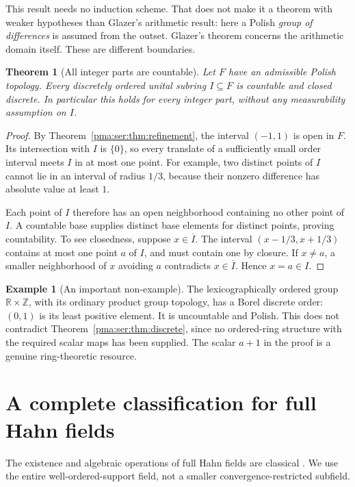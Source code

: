 \documentclass[11pt]{article}
\numberwithin{equation}{section}
\newtheorem{theorem}{Theorem}[section]
\theoremstyle{definition}
\newtheorem{example}[example]{Example}
\theoremstyle{remark}
\newcommand{\Z}{\mathbb Z}
\newcommand{\R}{\mathbb R}
\begin{document}
This result needs no induction scheme. That does not make it a theorem with
weaker hypotheses than Glazer's arithmetic result: here a Polish
\emph{group of differences} is assumed from the outset. Glazer's theorem
concerns the arithmetic domain itself. These are different boundaries.

\begin{theorem}[All integer parts are countable]\label{pma:ser:thm:integerparts}
Let $F$ have an admissible Polish topology. Every discretely ordered unital
subring $I\subseteq F$ is countable and closed discrete. In particular this
holds for every integer part, without any measurability assumption on $I$.
\end{theorem}
\begin{proof}
By Theorem~\ref{pma:ser:thm:refinement}, the interval $(-1,1)$ is open in $F$.
Its intersection with $I$ is $\{0\}$, so every translate of a sufficiently
small order interval meets $I$ in at most one point. For example, two distinct
points of $I$ cannot lie in an interval of radius $1/3$, because their
nonzero difference has absolute value at least $1$.

Each point of $I$ therefore has an open neighborhood containing no other
point of $I$. A countable base supplies distinct base elements for distinct
points, proving countability. To see closedness, suppose $x\in\overline I$.
The interval $(x-1/3,x+1/3)$ contains at most one point $a$ of $I$, and must
contain one by closure. If $x\ne a$, a smaller neighborhood of $x$ avoiding
$a$ contradicts $x\in\overline I$. Hence $x=a\in I$.
\end{proof}

\begin{example}[An important non-example]
The lexicographically ordered group $\R\times\Z$, with its ordinary product
group topology, has a Borel discrete order: $(0,1)$ is its least positive
element. It is uncountable and Polish. This does not contradict
Theorem~\ref{pma:ser:thm:discrete}, since no ordered-ring structure with the required
scalar maps has been supplied. The scalar $a+1$ in the proof is a genuine
ring-theoretic resource.
\end{example}

\section{A complete classification for full Hahn fields}
\label{pma:ser:sec:hahn}

The existence and algebraic operations of full Hahn fields are classical
\cite{Poonen}. We use the entire well-ordered-support field, not a smaller
convergence-restricted subfield.
\end{document}
